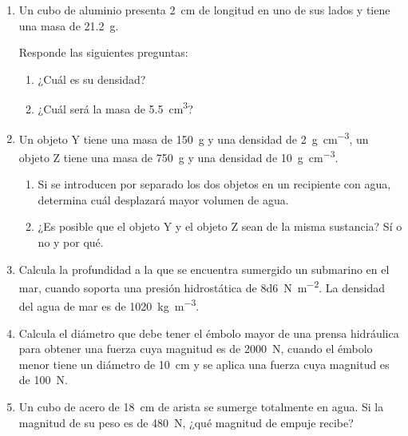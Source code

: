 \documentclass[14pt]{extarticle}
\begin{document}
\begin{enumerate}
\item Un cubo de aluminio presenta \SI{2}{\centi\meter} de longitud en uno de sus lados y tiene una masa de \SI{21.2}{\gram}.

Responde las siguientes preguntas:
\begin{enumerate}[label=\alph*)]
\item ¿Cuál es su densidad?
\item ¿Cuál será la masa de \SI{5.5}{\cubic\centi\meter}?
\end{enumerate}
\item Un objeto Y tiene una masa de \SI{150}{\gram} y una densidad de \SI{2}{\gram\per\cubic\centi\meter}, un objeto Z tiene una masa de \SI{750}{\gram} y una densidad de \SI{10}{\gram\per\cubic\centi\meter}.
\begin{enumerate}[label=\alph*)]
\item Si se introducen por separado los dos objetos en un recipiente con agua, determina cuál desplazará mayor volumen de agua.
\item ¿Es posible que el objeto Y y el objeto Z sean de la misma sustancia? Sí o no y por qué.
\end{enumerate}
\item Calcula la profundidad a la que se encuentra sumergido un submarino en el mar, cuando soporta una presión hidrostática de \SI{8d6}{\newton\per\square\meter}. La densidad del agua de mar es de \SI{1020}{\kilo\gram\per\cubic\meter}.
\item Calcula el diámetro que debe tener el émbolo mayor de una prensa hidráulica para obtener una fuerza cuya magnitud es de \SI{2000}{\newton}, cuando el émbolo menor tiene un diámetro de \SI{10}{\centi\meter} y se aplica una fuerza cuya magnitud es de \SI{100}{\newton}.
\item Un cubo de acero de \SI{18}{\centi\meter} de arista se sumerge totalmente en agua. Si la magnitud de su peso es de \SI{480}{\newton}, ¿qué magnitud de empuje recibe?
\end{enumerate}
\end{document}
